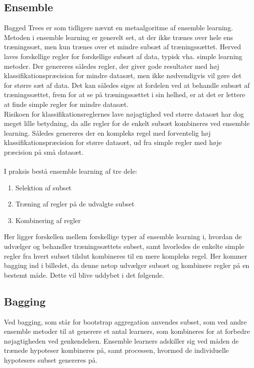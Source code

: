 \subsection{Ensemble}
Bagged Trees er som tidligere nævnt en metaalgoritme af ensemble learning. Metoden i ensemble learning er generelt set, at der ikke trænes over hele ens træningssæt, men kun trænes over et mindre subsæt af træningssættet. Herved laves forskellige regler for forskellige subsæt af data, typisk vha. simple learning metoder. Der genereres således regler, der giver gode resultater med høj klassifikationspræcision for mindre datasæt, men ikke nødvendigvis vil gøre det for større sæt af data. 
Det kan således siges at fordelen ved at behandle subsæt af træningssættet, frem for at se på træningssættet i sin helhed, er at det er lettere at finde simple regler for mindre datasæt.
\\Risikoen for klassifikationsreglernes lave nøjagtighed ved større datasæt har dog meget lille betydning, da alle regler for de enkelt subsæt kombineres ved ensemble learning. Således genereres der en kompleks regel med forventelig høj klassifikationspræcision for større datasæt, ud fra simple regler med høje præcision på små datasæt.
\\\\
I praksis bestå ensemble learning af tre dele:
\begin{enumerate}
\item Selektion af subset
\item Træning af regler på de udvalgte subset
\item Kombinering af regler 
\end{enumerate}

Her ligger forskellen mellem forskellige typer af ensemble learning i, hvordan de udvælger og behandler træningssættets subset, samt hvorledes de enkelte simple regler fra hvert subset tilslut kombineres til en mere kompleks regel. 
Her kommer bagging ind i billedet, da denne netop udvælger subsæt og kombinere regler på en bestemt måde. Dette vil blive uddybet i det følgende. 

\subsection{Bagging}
Ved bagging, som står for bootstrap aggregation anvendes subset, som ved andre ensemble metoder til at generere et antal learners, som kombineres for at forbedre nøjagtigheden ved genkendelsen. Ensemble learners adskiller sig ved måden de trænede hypoteser kombineres på, samt processen, hvormed de individuelle hypotesers subset genereres på. 

